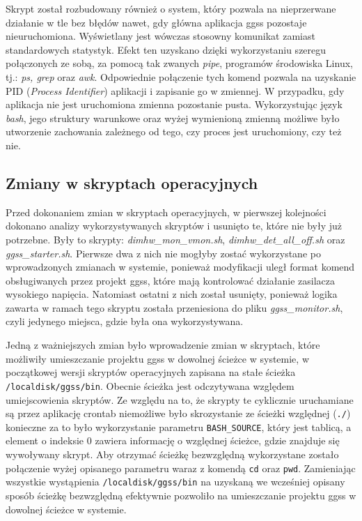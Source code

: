 Skrypt został rozbudowany również o system, który pozwala na nieprzerwane działanie w tle bez błędów nawet, gdy główna aplikacja ggss pozostaje nieuruchomiona. Wyświetlany jest wówczas stosowny komunikat zamiast standardowych statystyk. Efekt ten uzyskano dzięki wykorzystaniu szeregu połączonych ze sobą, za pomocą tak zwanych \emph{pipe}, programów środowiska Linux, tj.: \emph{ps, grep} oraz \emph{awk}. Odpowiednie połączenie tych komend pozwala na uzyskanie PID (\emph{Process Identifier}) aplikacji i zapisanie go w zmiennej. W przypadku, gdy aplikacja nie jest uruchomiona zmienna pozostanie pusta. Wykorzystując język \emph{bash}, jego struktury warunkowe oraz wyżej wymienioną zmienną możliwe było utworzenie zachowania zależnego od tego, czy proces jest uruchomiony, czy też nie.


\subsection{Zmiany w skryptach operacyjnych}

Przed dokonaniem zmian w skryptach operacyjnych, w pierwszej kolejności dokonano analizy wykorzystywanych skryptów i usunięto te, które nie były już potrzebne. Były to skrypty: \emph{dimhw\_mon\_vmon.sh}, \emph{dimhw\_det\_all\_off.sh} oraz \emph{ggss\_starter.sh}. Pierwsze dwa z nich nie mogłyby zostać wykorzystane po wprowadzonych zmianach w systemie, ponieważ modyfikacji uległ format komend obsługiwanych przez projekt ggss, które mają kontrolować działanie zasilacza wysokiego napięcia. Natomiast ostatni z nich został usunięty, ponieważ logika zawarta w ramach tego skryptu została przeniesiona do pliku \emph{ggss\_monitor.sh}, czyli jedynego miejsca, gdzie była ona wykorzystywana.

Jedną z ważniejszych zmian było wprowadzenie zmian w skryptach, które możliwiły umieszczanie projektu ggss w dowolnej ścieżce w systemie, w początkowej wersji skryptów operacyjnych zapisana na stałe ścieżka \lstinline{/localdisk/ggss/bin}. Obecnie ścieżka jest odczytywana względem umiejscowienia skryptów. Ze względu na to, że skrypty te cyklicznie uruchamiane są przez aplikację crontab niemożliwe było skrozystanie ze ścieżki względnej (\lstinline{./}) konieczne za to było wykorzystanie parametru \lstinline{BASH_SOURCE}, który jest tablicą, a element o indeksie 0 zawiera informację o względnej ścieżce, gdzie znajduje się wywoływany skrypt. Aby otrzymać ścieżkę bezwzględną wykorzystane zostało połączenie wyżej opisanego parametru waraz z komendą \lstinline{cd} oraz \lstinline{pwd}. Zamieniając wszystkie wystąpienia \lstinline{/localdisk/ggss/bin} na uzyskaną we wcześniej opisany sposób ścieżkę bezwzględną efektywnie pozwoliło na umieszczanie projektu ggss w dowolnej ścieżce w systemie.

